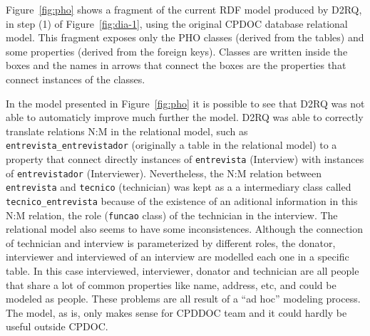 

Figure~\ref{fig:pho} shows a fragment of the current RDF model
produced by D2RQ, in step (1) of Figure~\ref{fig:dia-1}, using the
original CPDOC database relational model. This fragment exposes only
the PHO classes (derived from the tables) and some properties (derived
from the foreign keys). Classes are written inside the boxes and the
names in arrows that connect the boxes are the properties that connect
instances of the classes.

In the model presented in Figure~\ref{fig:pho} it is possible to see
that D2RQ was not able to automaticly improve much further the
model. D2RQ was able to correctly translate relations N:M in the
relational model, such as \texttt{entrevista\_entrevistador}
(originally a table in the relational model) to a property that
connect directly instances of \texttt{entrevista} (Interview) with
instances of \texttt{entrevistador} (Interviewer). Nevertheless, the
N:M relation between \texttt{entrevista} and \texttt{tecnico}
(technician) was kept as a a intermediary class called
\texttt{tecnico\_entrevista} because of the existence of an aditional
information in this N:M relation, the role (\texttt{funcao} class) of
the technician in the interview. The relational model also seems to
have some inconsistences. Although the connection of technician and
interview is parameterized by different roles, the donator,
interviewer and interviewed of an interview are modelled each one in a
specific table. In this case interviewed, interviewer, donator and
technician are all people that share a lot of common properties like
name, address, etc, and could be modeled as people. These problems are
all result of a ``ad hoc'' modeling process. The model, as is, only
makes sense for CPDDOC team and it could hardly be useful outside
CPDOC.

